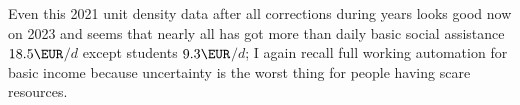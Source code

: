Even this 2021 unit density data after all corrections during years looks good now on 2023
and seems that nearly all has got more than daily basic social assistance
$18.5\EUR$$\slash d$\cite{KELA_BASIC_ASSISTANCE}
except students $9.3\EUR$$\slash d$\cite{KELA_StudyGrant};
I again recall full working automation for basic income \cite{BasicIncomeInit}
because uncertainty is the worst thing for people having scare resources.

